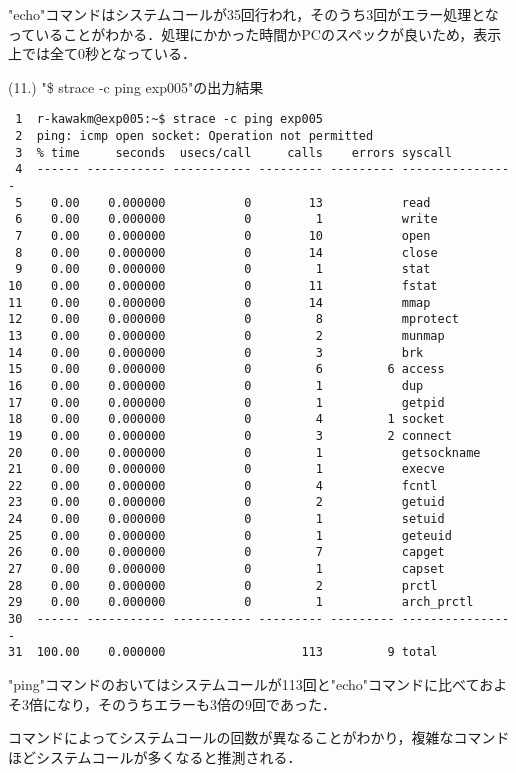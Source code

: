 \documentclass[a4j]{jarticle}
\newenvironment{bit}{\begin{breakitembox}}{\end{breakitembox}} %
\begin{document}
"echo"コマンドはシステムコールが35回行われ，そのうち3回がエラー処理となっていることがわかる．処理にかかった時間かPCのスペックが良いため，表示上では全て0秒となっている．

\begin{bit}[l]{(11.) "\$ strace -c ping exp005"の出力結果}
\small{
\begin{verbatim}
 1	r-kawakm@exp005:~$ strace -c ping exp005
 2	ping: icmp open socket: Operation not permitted
 3	% time     seconds  usecs/call     calls    errors syscall
 4	------ ----------- ----------- --------- --------- ----------------
 5	  0.00    0.000000           0        13           read
 6	  0.00    0.000000           0         1           write
 7	  0.00    0.000000           0        10           open
 8	  0.00    0.000000           0        14           close
 9	  0.00    0.000000           0         1           stat
10	  0.00    0.000000           0        11           fstat
11	  0.00    0.000000           0        14           mmap
12	  0.00    0.000000           0         8           mprotect
13	  0.00    0.000000           0         2           munmap
14	  0.00    0.000000           0         3           brk
15	  0.00    0.000000           0         6         6 access
16	  0.00    0.000000           0         1           dup
17	  0.00    0.000000           0         1           getpid
18	  0.00    0.000000           0         4         1 socket
19	  0.00    0.000000           0         3         2 connect
20	  0.00    0.000000           0         1           getsockname
21	  0.00    0.000000           0         1           execve
22	  0.00    0.000000           0         4           fcntl
23	  0.00    0.000000           0         2           getuid
24	  0.00    0.000000           0         1           setuid
25	  0.00    0.000000           0         1           geteuid
26	  0.00    0.000000           0         7           capget
27	  0.00    0.000000           0         1           capset
28	  0.00    0.000000           0         2           prctl
29	  0.00    0.000000           0         1           arch_prctl
30	------ ----------- ----------- --------- --------- ----------------
31	100.00    0.000000                   113         9 total
\end{verbatim}
}
\end{bit}

"ping"コマンドのおいてはシステムコールが113回と"echo"コマンドに比べておよそ3倍になり，そのうちエラーも3倍の9回であった．

コマンドによってシステムコールの回数が異なることがわかり，複雑なコマンドほどシステムコールが多くなると推測される．
\end{document}
